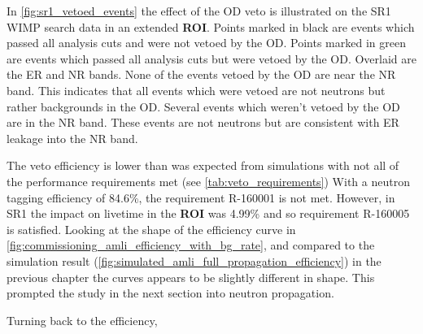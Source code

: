 %



\par
In \autoref{fig:sr1_vetoed_events} the effect of the OD veto is illustrated on the SR1 WIMP search data in an extended \textbf{ROI}.
Points marked in black are events which passed all analysis cuts and were not vetoed by the OD.
Points marked in green are events which passed all analysis cuts but were vetoed by the OD.
Overlaid are the ER and NR bands.
None of the events vetoed by the OD are near the NR band.
This indicates that all events which were vetoed are not neutrons but rather backgrounds in the OD.
Several events which weren't vetoed by the OD are in the NR band.
These events are not neutrons but are consistent with ER leakage into the NR band.

\par
The veto efficiency is lower than was expected from simulations with not all of the performance requirements met (see \autoref{tab:veto_requirements})
With a neutron tagging efficiency of 84.6\%, the requirement R-160001 is not met.
However, in SR1 the impact on livetime in the \textbf{ROI} was 4.99\% and so requirement R-160005 is satisfied.
Looking at the shape of the efficiency curve in \autoref{fig:commissioning_amli_efficiency_with_bg_rate}, and compared to the simulation result (\autoref{fig:simulated_amli_full_propagation_efficiency}) in the previous chapter the curves appears to be slightly different in shape.
This prompted the study in the next section into neutron propagation.




\par
Turning back to the efficiency,

